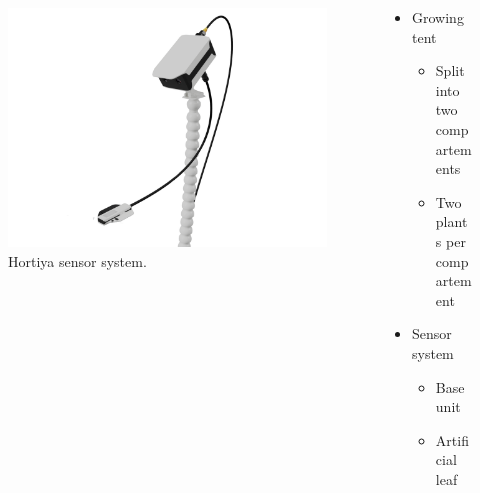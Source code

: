 \begin{frame}
\begin{columns}
\begin{column}{0.5\textwidth}
{\begin{figure}
                    \centering
                    \includegraphics[scale=0.066]{figures/ceres.png}
                    \caption{Hortiya sensor system.}
                \end{figure}
            }
        \end{column}
        \begin{column}{0.5\textwidth}
            \begin{itemize}
                \item<1-> Growing tent
                \begin{itemize}
                    \item<1-> Split into two compartements
                    \item<1-> Two plants per compartement
                \end{itemize}
                \item<2-> Sensor system
                \begin{itemize}
                    \item<2-> Base unit
                    \item<2-> Artificial leaf
                \end{itemize}
            \end{itemize}
        \end{column}
    \end{columns}
\end{frame}

